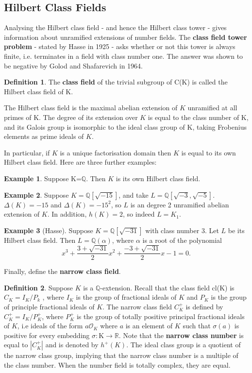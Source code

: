 \documentclass[12pt]{extarticle}
\newcommand{\Q}{\mathbb{Q}}
\newcommand{\<}{\langle}
\renewcommand{\>}{\rangle}
\theoremstyle{definition}
\newtheorem*{definition}{Definition}
\newtheorem*{example}{Example}
\begin{document}
\subsection{Hilbert Class Fields}
Analysing the Hilbert class field - and hence the Hilbert class tower - gives information about unramified extensions of number fields. The \textbf{class
field tower problem} - stated by Hasse in 1925 -  asks whether or not this tower is always finite, i.e. terminates in a field with class number one. The answer was shown to be negative by
Golod and Shafarevich in 1964. 
\begin{definition}
The \textbf{class field} of the trivial subgroup of C(K) is called the Hilbert class field of K. 
\end{definition}
The Hilbert class field is the maximal abelian extension of $K$ unramified at all primes of K. The degree of its extension over $K$ is equal to the class number of K, and its Galois group is isomorphic to the ideal class group of K, taking Frobenius elements as prime ideals of $K$. \par
In particular, if $K$ is a unique factorisation domain then $K$ is equal to its own Hilbert class field. 
Here are three further examples:
\begin{example}
    Suppose K=$\mathbb{Q}$. Then $K$ is its own Hilbert class field. 
\end{example}
\begin{example}
    Suppose $K=\mathbb{Q}[\sqrt{-15}]$, and take $L=\Q[\sqrt{-3},\sqrt{-5}]$.  $\Delta(K) = -15$ and $\Delta(K) = -15^2$, so $L$ is an degree 2 unramified abelian extension of $K$. In addition, $h(K)=2$, so indeed $L=K_1$.  
\end{example}
\begin{example}[Hasse]
    Suppose $K=\mathbb{Q}[\sqrt{-31}]$ with class number 3. Let $L$ be its Hilbert class field. Then $L = \Q(\alpha)$, where $\alpha$ is a root of the polynomial 
    \begin{equation}
        x^3+\frac{3+\sqrt{-31}}{2}x^2+\frac{-3+\sqrt{-31}}{2}x -1 =0.
    \end{equation}
\end{example}

Finally, define the \textbf{narrow class field}.
\begin{definition}
Suppose $K$ is a $\Q$-extension. Recall that the class field cl(K) is $C_K = I_K/P_k$ , where $I_K$ is the group of fractional ideals of $K$ and $P_K$ is the group of principle fractional ideals of $K$. The narrow class field $C_K^{+}$ is defined by $C_K^{+} = I_K/P_K^{+}$, where $P_K^{+}$ is the group of totally positive principal fractional ideals of $K$, i.e ideals of the form $a\mathcal{O}_K$ where $a$ is an element of $K$ such that $\sigma(a)$ is positive for every embedding $\sigma: $K$ \rightarrow \mathbb{R}$. 
Note that the \textbf{narrow class number} is equal to $|C_K^{+}|$ and is denoted by $h^{+}(K)$. 
  The ideal class group is a quotient of the narrow class group, implying that the narrow class number is a multiple of the class number. When the number field is totally complex, they are equal. 


\end{definition}
\end{document}
